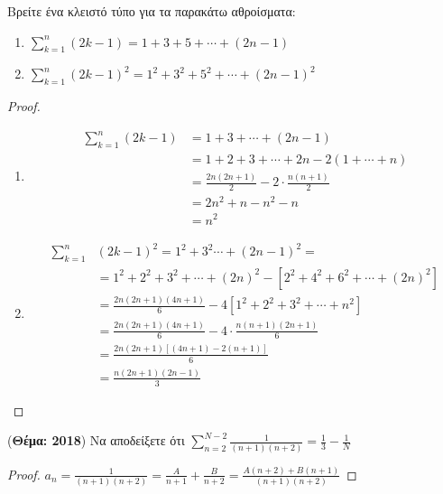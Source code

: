 \begin{multicols}{2}
\begin{enumerate}
    \item \label{ask:sums} \textcolor{Col1}{Βρείτε ένα κλειστό τύπο για τα 
        παρακάτω αθροίσματα: 
        \begin{enumerate}
          \item $ \sum_{k=1}^{n} (2k-1) = 1 + 3 + 5 + \cdots + (2n-1)  $
          \item $ \sum_{k=1}^{n} (2k-1)^{2} = 1^{2} + 3^{2} + 5^{2} 
            + \cdots + (2n-1)^{2}  $ 
      \end{enumerate}}
      \begin{proof}
      \item {}
        \begin{enumerate}
          \item \begin{align*}
              \sum_{k=1}^{n} (2k-1) &= 1 + 3 + \cdots + (2n-1) \\
                                    &=1 + 2 + 3 +\cdots +2n - 2(1+\cdots +n) \\
                                    &= \frac{2n(2n+1)}{2}-2 \cdot \frac{n(n+1)}{2} \\
                                    &=2n^{2}+n-n^{2}-n \\
                                    &=n^{2}
            \end{align*}
          \item \begin{align*}
              \sum_{k=1}^{n}
              & (2k-1)^{2} =1^{2}+3^{2}\cdots + (2n-1)^{2} = \\
              &=1^{2}+2^{2}+3^{2}+\cdots +(2n)^{2}-[2^{2}+4^{2}+6^{2}+\cdots +
              (2n)^{2}] \\
              &= \frac{2n(2n+1)(4n+1)}{6} - 4[1^{2}+2^{2}+3^{2}+\cdots +n^{2}] \\
              &= \frac{2n(2n+1)(4n+1)}{6} - 4 \cdot \frac{n(n+1)(2n+1)}{6} \\
              &= \frac{2n(2n+1)[(4n+1)-2(n+1)]}{6} \\
              &= \frac{n(2n+1)(2n-1)}{3} 
            \end{align*}
        \end{enumerate}
      \end{proof}

    \item \label{ask:thema18sum} \textcolor{Col1}{({\bfseries Θέμα: 2018}) 
        Να αποδείξετε ότι $ \sum_{n=2}^{N-2} \frac{1}{(n+1)(n+2)} 
      = \frac{1}{3} - \frac{1}{N} $}
      \begin{proof}
      \item {}
        $ a_n = \frac{1}{(n+1)(n+2)} = \frac{A}{n+1} + \frac{B}{n+2} = 
        \frac{A(n+2)+B(n+1)}{(n+1)(n+2)} $


\end{proof}
\end{enumerate}
\end{multicols}
